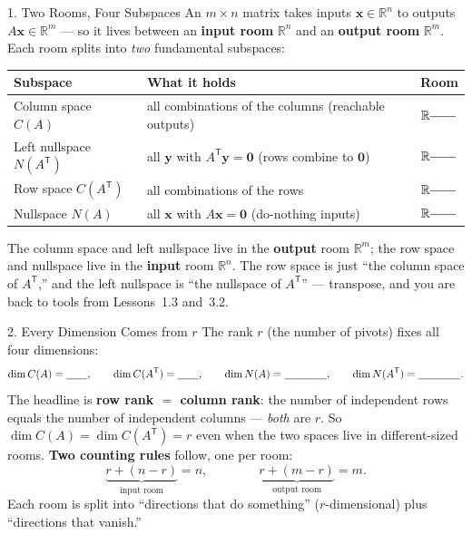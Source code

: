 \documentclass[10pt]{article}
\newcommand{\xx}{\mathbf{x}}
\newcommand{\yy}{\mathbf{y}}
\newcommand{\zero}{\mathbf{0}}
\newcommand{\T}{\mathsf{T}}
\begin{document}
\begin{notesbox}{1. Two Rooms, Four Subspaces}
An $m\times n$ matrix takes inputs $\xx\in\mathbb{R}^n$ to outputs $A\xx\in\mathbb{R}^m$ --- so it lives
between an \textbf{input room} $\mathbb{R}^n$ and an \textbf{output room} $\mathbb{R}^m$. Each room splits
into \emph{two} fundamental subspaces:
\begin{center}\small
\renewcommand{\arraystretch}{1.3}
\begin{tabular}{@{}l l l@{}}
\textbf{Subspace} & \textbf{What it holds} & \textbf{Room} \\
\hline
Column space $C(A)$ & all combinations of the columns (reachable outputs) & $\mathbb{R}^{\blank{0.7cm}}$ \\
Left nullspace $N(A^{\T})$ & all $\yy$ with $A^{\T}\yy=\zero$ (rows combine to $\zero$) & $\mathbb{R}^{\blank{0.7cm}}$ \\
Row space $C(A^{\T})$ & all combinations of the rows & $\mathbb{R}^{\blank{0.7cm}}$ \\
Nullspace $N(A)$ & all $\xx$ with $A\xx=\zero$ (do-nothing inputs) & $\mathbb{R}^{\blank{0.7cm}}$ \\
\end{tabular}
\end{center}
The column space and left nullspace live in the \textbf{output} room $\mathbb{R}^m$; the row space and
nullspace live in the \textbf{input} room $\mathbb{R}^n$. The row space is just ``the column space of
$A^{\T}$,'' and the left nullspace is ``the nullspace of $A^{\T}$'' --- transpose, and you are back to tools
from Lessons~1.3 and~3.2.
\end{notesbox}

\begin{notesbox}{2. Every Dimension Comes from $r$}
The rank $r$ (the number of pivots) fixes all four dimensions:
\[
  \dim C(A)=\blank{0.7cm}, \qquad \dim C(A^{\T})=\blank{0.7cm}, \qquad
  \dim N(A)=\blank{1.4cm}, \qquad \dim N(A^{\T})=\blank{1.4cm}.
\]
The headline is \textbf{row rank $=$ column rank}: the number of independent rows equals the number of
independent columns --- \emph{both} are $r$. So $\dim C(A)=\dim C(A^{\T})=r$ even when the two spaces live
in different-sized rooms. \textbf{Two counting rules} follow, one per room:
\[
  \underbrace{r+(n-r)}_{\text{input room}}=n, \qquad\qquad \underbrace{r+(m-r)}_{\text{output room}}=m.
\]
Each room is split into ``directions that do something'' ($r$-dimensional) plus ``directions that vanish.''
\end{notesbox}
\end{document}
